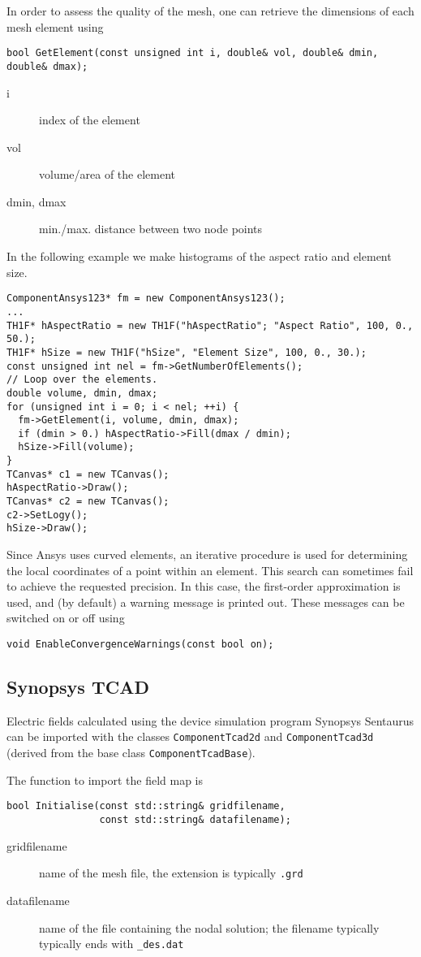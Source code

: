 In order to assess the quality of the mesh, 
one can retrieve the dimensions of each mesh element using
\begin{lstlisting}
bool GetElement(const unsigned int i, double& vol, double& dmin, double& dmax);
\end{lstlisting}
\begin{description}
\item[i] index of the element
\item[vol] volume/area of the element
\item[dmin, dmax] min./max. distance between two node points
\end{description}

In the following example we make histograms of the aspect ratio and 
element size.
\begin{lstlisting}
ComponentAnsys123* fm = new ComponentAnsys123();
...
TH1F* hAspectRatio = new TH1F("hAspectRatio"; "Aspect Ratio", 100, 0., 50.);
TH1F* hSize = new TH1F("hSize", "Element Size", 100, 0., 30.);
const unsigned int nel = fm->GetNumberOfElements();
// Loop over the elements.
double volume, dmin, dmax;
for (unsigned int i = 0; i < nel; ++i) {
  fm->GetElement(i, volume, dmin, dmax);
  if (dmin > 0.) hAspectRatio->Fill(dmax / dmin);
  hSize->Fill(volume);
}
TCanvas* c1 = new TCanvas();
hAspectRatio->Draw();
TCanvas* c2 = new TCanvas();
c2->SetLogy();
hSize->Draw();
\end{lstlisting}

Since Ansys uses curved elements, an iterative procedure is used for 
determining the local coordinates of a point within an element. 
This search can sometimes fail to achieve the requested precision.
In this case, the first-order approximation is used, and (by default) 
a warning message is printed out. These messages can be switched on or off 
using 
\begin{lstlisting}
void EnableConvergenceWarnings(const bool on);
\end{lstlisting}

\subsection{Synopsys TCAD}

Electric fields calculated using the device simulation program 
Synopsys Sentaurus \cite{Synopsys} can be imported with the classes 
\texttt{ComponentTcad2d} and \texttt{ComponentTcad3d} (derived from 
the base class \texttt{ComponentTcadBase}).

The function to import the field map is 
\begin{lstlisting}
bool Initialise(const std::string& gridfilename,
                const std::string& datafilename);
\end{lstlisting}
\begin{description}
  \item[gridfilename]
  name of the mesh file, the extension is typically \texttt{.grd}
  \item[datafilename]
  name of the file containing the nodal solution;
  the filename typically typically ends with \texttt{\_des.dat}
\end{description}

